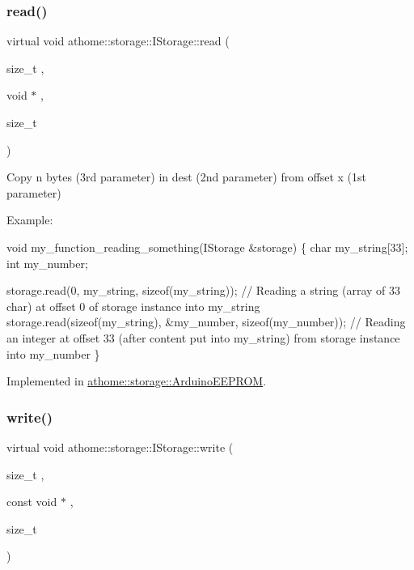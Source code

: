 \subsubsection{\texorpdfstring{read()}{read()}}
{\footnotesize\ttfamily virtual void athome\+::storage\+::\+I\+Storage\+::read (\begin{DoxyParamCaption}\item[{size\+\_\+t}]{,  }\item[{void $\ast$}]{,  }\item[{size\+\_\+t}]{ }\end{DoxyParamCaption})\hspace{0.3cm}{\ttfamily [pure virtual]}}

Copy n bytes (3rd parameter) in dest (2nd parameter) from offset x (1st parameter)

Example\+:


\begin{DoxyCode}
\textcolor{keywordtype}{void} my\_function\_reading\_something(IStorage &storage) \{
  \textcolor{keywordtype}{char} my\_string[33];
  \textcolor{keywordtype}{int} my\_number;

  storage.read(0, my\_string, \textcolor{keyword}{sizeof}(my\_string)); \textcolor{comment}{// Reading a string (array of 33 char) at offset 0 of
       storage instance into my\_string}
  storage.read(\textcolor{keyword}{sizeof}(my\_string), &my\_number, \textcolor{keyword}{sizeof}(my\_number)); \textcolor{comment}{// Reading an integer at offset 33 (after
       content put into my\_string) from storage instance into my\_number}
\}
\end{DoxyCode}
 

Implemented in \mbox{\hyperlink{classathome_1_1storage_1_1_arduino_e_e_p_r_o_m_a853674189981dd3395ea76911d2eb1a0}{athome\+::storage\+::\+Arduino\+E\+E\+P\+R\+OM}}.

\mbox{\label{classathome_1_1storage_1_1_i_storage_a1017bb6ad438313b98197893954e52f1}} 
\subsubsection{\texorpdfstring{write()}{write()}}
{\footnotesize\ttfamily virtual void athome\+::storage\+::\+I\+Storage\+::write (\begin{DoxyParamCaption}\item[{size\+\_\+t}]{,  }\item[{const void $\ast$}]{,  }\item[{size\+\_\+t}]{ }\end{DoxyParamCaption})\hspace{0.3cm}{\ttfamily [pure virtual]}}

